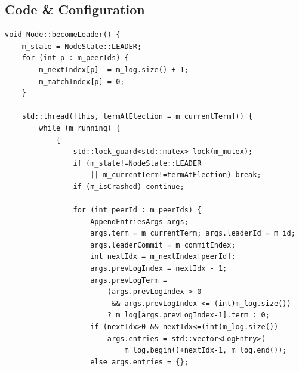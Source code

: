 \documentclass[11pt, a4paper]{article}
\begin{document}
\subsection{Code \& Configuration}
\begin{lstlisting}[style=cppstyle, caption={Node.cpp --- becomeLeader() and clientRequest()}]
void Node::becomeLeader() {
    m_state = NodeState::LEADER;
    for (int p : m_peerIds) {
        m_nextIndex[p]  = m_log.size() + 1;
        m_matchIndex[p] = 0;
    }

    std::thread([this, termAtElection = m_currentTerm]() {
        while (m_running) {
            {
                std::lock_guard<std::mutex> lock(m_mutex);
                if (m_state!=NodeState::LEADER
                    || m_currentTerm!=termAtElection) break;
                if (m_isCrashed) continue;

                for (int peerId : m_peerIds) {
                    AppendEntriesArgs args;
                    args.term = m_currentTerm; args.leaderId = m_id;
                    args.leaderCommit = m_commitIndex;
                    int nextIdx = m_nextIndex[peerId];
                    args.prevLogIndex = nextIdx - 1;
                    args.prevLogTerm =
                        (args.prevLogIndex > 0
                         && args.prevLogIndex <= (int)m_log.size())
                        ? m_log[args.prevLogIndex-1].term : 0;
                    if (nextIdx>0 && nextIdx<=(int)m_log.size())
                        args.entries = std::vector<LogEntry>(
                            m_log.begin()+nextIdx-1, m_log.end());
                    else args.entries = {};


\end{lstlisting}
\end{document}
